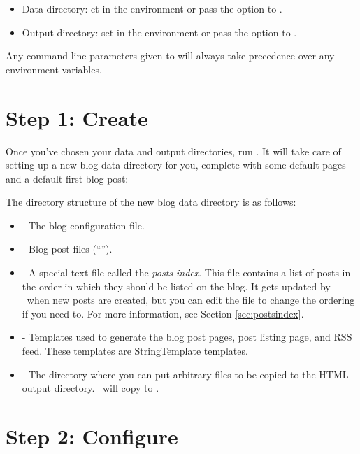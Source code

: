 \documentclass[11pt, letterpaper, oneside, titlepage]{book}
\begin{document}
\begin{itemize}
\item{Data directory: et  in the environment or pass
  the  option to .}
\item{Output directory: set  in the environment or
  pass the  option to .}
\end{itemize}

Any command line parameters given to  will always take
precedence over any environment variables.

\section{Step 1: Create}

Once you've chosen your data and output directories, run .
It will take care of setting up a new blog data directory for you,
complete with some default pages and a default first blog post:


The directory structure of the new blog data directory is as follows:

\begin{itemize}
\item{ - The blog configuration file.}
\item{ - Blog post files (``'').}
\item{ - A special text file called the
  \textit{posts index}.  This file contains a list of posts in the
  order in which they should be listed on the blog.  It gets updated
  by \mathblog\ when new posts are created, but you can edit the file
  to change the ordering if you need to.  For more information, see
  Section \ref{sec:postsindex}.}
\item{ - Templates used to generate the blog post
  pages, post listing page, and RSS feed.  These templates are
  StringTemplate templates.}
\item{ - The directory where you can put arbitrary files
  to be copied to the HTML output directory.  \mathblog\ will copy
   to .}
\end{itemize}

\section{Step 2: Configure}
\label{sec:configuration}
\end{document}
